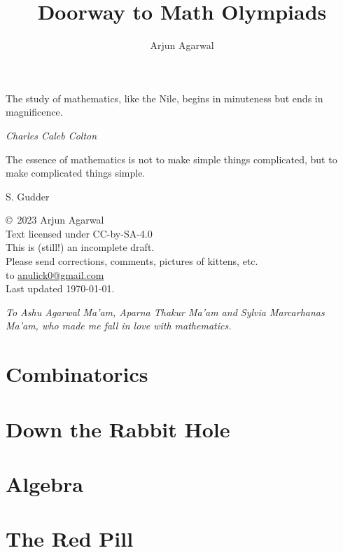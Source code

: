 \documentclass{maaprb}
\title{Doorway to Math Olympiads}
\author{Arjun Agarwal}
\theoremstyle{definition}
\theoremstyle{remark}
\numberwithin{section}{chapter}
\numberwithin{equation}{chapter}
\begin{document}
\frontmatter
\maketitle
\epigraph{The study of mathematics, like the Nile, begins in minuteness but ends in magnificence.}{\textit{Charles Caleb Colton}}
\epigraph{The essence of mathematics is not to make simple things complicated, but to make complicated things simple.}{S. Gudder}
\pagebreak

\begin{center}
\copyright\ 2023 Arjun Agarwal \\
Text licensed under CC-by-SA-4.0 \\
This is (still!) an incomplete draft. \\
Please send corrections, comments, pictures of kittens, etc. \\
to \href{mailto:anulick0@gmail.com}{anulick0@gmail.com} \\
Last updated \today.
\end{center}
\pagebreak

\thispagestyle{empty}
\vspace*{13.5pc}
\begin{center}
{\em To Ashu Agarwal Ma'am, Aparna Thakur Ma'am and Sylvia Marcarhanas Ma'am, who made me fall in love with mathematics.} 
\end{center}
\pagebreak


\tableofcontents



\mainmatter

\part{Combinatorics}






\part{Down the Rabbit Hole}




\part{Algebra}




\part{The Red Pill}




\end{document}
